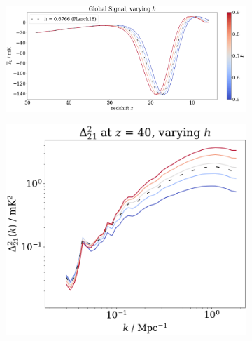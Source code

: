 \documentclass[floats,floatfix,showpacs,amssymb,prd,superscriptaddress,nofootinbib, 11pt]{revtex4-2} %
\begin{document}
\begin{figure}[H]
     \centering
     \begin{subfigure}[b]{0.8\textwidth}
         \centering
         \includegraphics[width=\textwidth]{images/simulation_results/global_signal_h.png}
         \label{fig:global_signal_h}
     \end{subfigure}
     \hfill
     \begin{subfigure}[b]{0.45\textwidth}
         \centering
         \includegraphics[width=\textwidth]{images/simulation_results/power_spectrum_fixed_z_40_h.png}
         \label{fig:power_spectrum_fixed_z_40_h}
     \end{subfigure}
     \hfill
     \begin{subfigure}[b]{0.45\textwidth}
         \centering

\end{subfigure}
\end{figure}
\end{document}

